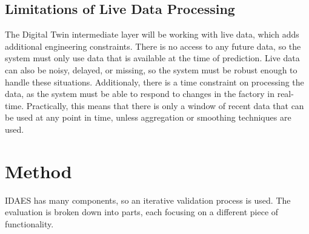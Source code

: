 \documentclass[12pt]{article}
\begin{document}
\subsection{Limitations of Live Data Processing} \label{sec:limitations_framework}


The Digital Twin intermediate layer will be working with live data, which adds additional engineering constraints. There is no access to any future data, so the system must only use data that is available at the time of prediction. Live data can also be noisy, delayed, or missing, so the system must be robust enough to handle these situations. Additionaly, there is a time constraint on processing the data, as the system must be able to respond to changes in the factory in real-time. Practically, this means that there is only a window of recent data that can be used at any point in time, unless aggregation or smoothing techniques are used.

\section{Method}

IDAES has many components, so an iterative validation process is used. The evaluation is broken down into parts, each focusing on a different piece of functionality. 
\end{document}
